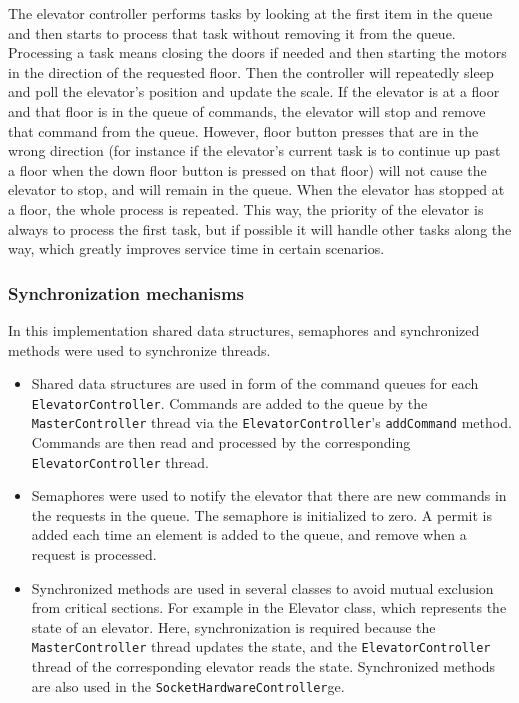 \documentclass[a4paper]{article}
\begin{document}
The elevator controller performs tasks by looking at the first item in the queue
and then starts to process that task without removing it from the queue.
Processing a task means closing the doors if needed and then starting the motors
in the direction of the requested floor. Then the controller will repeatedly
sleep and poll the elevator's position and update the scale. If the elevator is
at a floor and that floor is in the queue of commands, the elevator will stop
and remove that command from the queue. However, floor button presses that are
in the wrong direction (for instance if the elevator's current task is to
continue up past a floor when the down floor button is pressed on that floor)
will not cause the elevator to stop, and will remain in the queue. When the
elevator has stopped at a floor, the whole process is repeated. This way, the
priority of the elevator is always to process the first task, but if possible it
will handle other tasks along the way, which greatly improves service time in
certain scenarios.

\subsubsection{Synchronization mechanisms}
In this implementation shared data structures, semaphores and synchronized methods were used to synchronize threads.
\begin{itemize}
\item Shared data structures are used in form of the command queues for each \texttt{ElevatorController}. Commands are added to the queue by the \texttt{MasterController} thread via the \texttt{ElevatorController}'s \texttt{addCommand} method. Commands are then read and processed by the corresponding \texttt{ElevatorController} thread.
\item Semaphores were used to notify the elevator that there are new commands in the requests in the queue. The semaphore is initialized to zero. A permit is added each time an element is added to the queue, and remove when a request is processed.
\item Synchronized methods are used in several classes to avoid mutual exclusion from critical sections. For example in the Elevator class, which represents the state of an elevator. Here, synchronization is required because the \texttt{MasterController} thread updates the state, and the \texttt{ElevatorController} thread of the corresponding elevator reads the state. Synchronized methods are also used in the \texttt{SocketHardwareController}ge.
\end{itemize}
\end{document}
